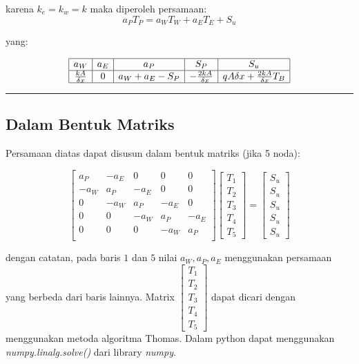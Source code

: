 \documentclass[11pt]{article}
\begin{document}
karena \(k_e = k_w = k\) maka diperoleh persamaan:
\[a_P T_P = a_W T_W+a_E T_E + S_u\]

yang:

\[\begin{array}{|c|c|c|c|c|}\hline a_W & a_E & a_P & S_P & S_u \\
\hline
\frac{k A}{\delta x} & 0 & a_W+a_E-S_P & -\frac{2kA}{\delta x} & qA\delta x + \frac{2kA}{\delta x}T_B \\ \hline
\end{array}\]

\begin{center}\rule{0.5\linewidth}{\linethickness}\end{center}

\subsection{Dalam Bentuk Matriks}\label{dalam-bentuk-matriks}

Persamaan diatas dapat disusun dalam bentuk matriks (jika 5 noda):

\[\left[ \begin{array}{ccccc}a_P & -a_E & 0 & 0 & 0 \\
-a_W & a_P & -a_E & 0 & 0 \\
0 & -a_W & a_P & -a_E & 0 \\
0 & 0 & -a_W & a_P & -a_E \\
0 & 0 & 0 & -a_W & a_P \\\end{array}\right]
\left[ \begin{array}{c} T_1 \\ T_2 \\ T_3 \\ T_4 \\ T_5 \end{array} \right] = 
\left[ \begin{array}{c} S_u \\ S_u \\ S_u \\ S_u \\ S_u \end{array} \right]
\]

dengan catatan, pada baris \(1\) dan \(5\) nilai \(a_W, a_P, a_E\)
menggunakan persamaan yang berbeda dari baris lainnya. Matrix
\(\left[ \begin{array}{c} T_1 \\ T_2 \\ T_3 \\ T_4 \\ T_5 \end{array} \right]\)
dapat dicari dengan menggunakan metoda algoritma Thomas. Dalam python
dapat menggunakan \emph{numpy.linalg.solve()} dari library \emph{numpy}.
\end{document}
